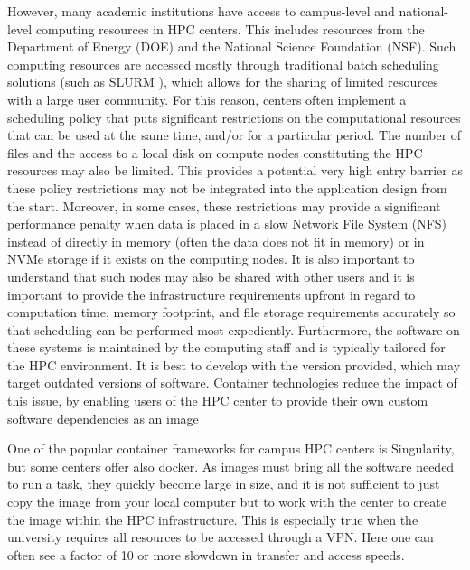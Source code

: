 \documentclass[utf8]{FrontiersinVancouver} %
\begin{document}
{However, many academic institutions have access to campus-level and
national-level computing resources in HPC centers.  This includes
resources from the Department of Energy (DOE) and the National Science
Foundation (NSF). Such computing resources are accessed mostly through
traditional batch scheduling solutions (such as SLURM
\citep{www-slurm}), which allows for the sharing of limited resources
with a large user community. For this reason, centers often implement
a scheduling policy that puts significant restrictions on the
computational resources that can be used at the same time, and/or for
a particular period. The number of files and the access to a local
disk on compute nodes constituting the HPC resources may also be
limited.  This provides a potential very high entry barrier as these
policy restrictions may not be integrated into the application design
from the start.  Moreover, in some cases, these restrictions may
provide a significant performance penalty when data is placed in a
slow Network File System (NFS) instead of directly in memory (often
the data does not fit in memory) or in NVMe storage if it exists on
the computing nodes.  It is also important to understand that such
nodes may also be shared with other users and it is important to
provide the infrastructure requirements upfront in regard to
computation time, memory footprint, and file storage requirements
accurately so that scheduling can be performed most expediently.
Furthermore, the software on these systems is maintained by the
computing staff and is typically tailored for the HPC environment.  It
is best to develop with the version provided, which may target
outdated versions of software.  Container technologies reduce the
impact of this issue, by enabling users of the HPC center to provide
their own custom software dependencies as an image
 

One of the popular container frameworks for campus HPC centers is
Singularity, but some centers offer also docker. As images must bring
all the software needed to run a task, they quickly become large in
size, and it is not sufficient to just copy the image from your local
computer but to work with the center to create the image within the
HPC infrastructure. This is especially true when the university
requires all resources to be accessed through a VPN. Here one can
often see a factor of 10 or more slowdown in transfer and access
speeds.

}
\end{document}
